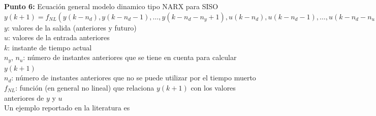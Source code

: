 \documentclass[10pt,onecolumn,twoside,letterpaper]{article}
\begin{document}
\par{\bf \large Punto 6:} Ecuaci\'on general modelo dinamico tipo NARX para SISO\\
$y(k+1)=f_{NL}(y(k-n_d),y(k-n_d-1),\dots,y(k-n_d-n_y+1),u(k-n_d),u(k-n_d-1),\dots,u(k-n_d-n_u+1))$\\
$y$: valores de la salida (anteriores y futuro)\\
$u$: valores de la entrada anteriores\\
$k$: instante de tiempo actual\\
$n_y$, $n_u$: número de instantes anteriores que se tiene en cuenta para calcular $y(k+1)$\\
$n_d$: número de instantes anteriores que no se puede utilizar por el tiempo muerto\\
$f_{NL}$: función (en general no lineal) que relaciona $y(k+1)$ con los valores anteriores de $y$ y $u$\\
Un ejemplo reportado en la literatura es \cite{Ho2008}
\end{document}

